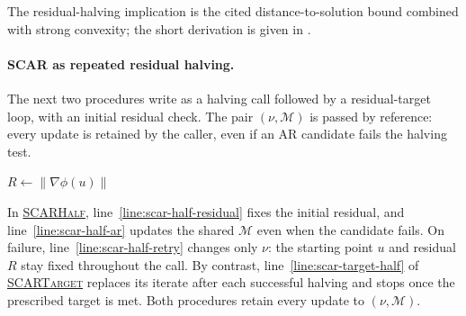 \documentclass{article}
\begin{document}
The residual-halving implication is the cited distance-to-solution
bound combined with strong convexity; the short derivation is given
in . 

\paragraph{SCAR as repeated residual halving.}
The next two procedures write
\citet[Algorithm~5.1]{lan2026optimal} as a halving call followed by
a residual-target loop, with an initial residual check.  The pair
$(\nu,\mathcal M)$ is passed by reference: every update is retained
by the caller, even if an AR candidate fails the halving test.

\begin{procedure}[H]
\DontPrintSemicolon
\caption{SCARHalf($\phi,u;\nu,\mathcal M$)}
\label{proc:scar-half}
$R\leftarrow\|\nabla\phi(u)\|$\label{line:scar-half-residual}\;
\end{procedure}

\begin{procedure}[H]
\DontPrintSemicolon
\caption{SCARTarget($\phi,u,\tau;\nu,\mathcal M$)}
\label{proc:scar-target}
\;
\end{procedure}

In \hyperref[proc:scar-half]{\textsc{SCARHalf}},
line~\ref{line:scar-half-residual} fixes the initial residual, and
line~\ref{line:scar-half-ar} updates the shared $\mathcal M$ even
when the candidate fails.  On failure,
line~\ref{line:scar-half-retry} changes only $\nu$: the starting
point $u$ and residual $R$ stay fixed throughout the call.
By contrast, line~\ref{line:scar-target-half} of
\hyperref[proc:scar-target]{\textsc{SCARTarget}} replaces its
iterate after each successful halving and stops once the prescribed
target is met.  Both procedures retain every update to
$(\nu,\mathcal M)$.
\end{document}
